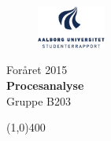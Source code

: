 \clearpage
\thispagestyle{empty}

\begin{figure}[H]
	\raggedleft
		\includegraphics[width=0.2\textwidth]{figures/aaulogo-da.png}
\end{figure}
\vspace*{\fill} 
\begin{center}	
\begin{Huge}
Foråret 2015\\
\vspace{5 mm}
\textbf{Procesanalyse}\\
\vspace{3 mm}
Gruppe B203
\end{Huge}
\end{center}
\vspace*{\fill}


\begin{center}
\line(1,0){400}
\end{center}